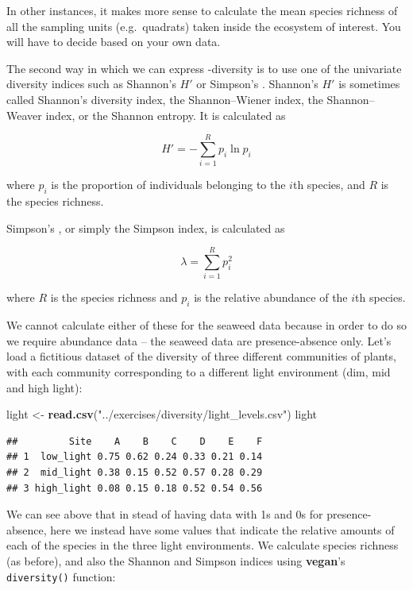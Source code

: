 \documentclass[10pt,a4,]{article}
\newenvironment{Shaded}{\begin{snugshade}}{\end{snugshade}}
\newcommand{\KeywordTok}[1]{\textcolor[rgb]{0.13,0.29,0.53}{\textbf{#1}}}
\newcommand{\NormalTok}[1]{#1}
\newcommand{\StringTok}[1]{\textcolor[rgb]{0.31,0.60,0.02}{#1}}
\begin{document}
In other instances, it makes more sense to calculate the mean species
richness of all the sampling units (e.g.~quadrats) taken inside the
ecosystem of interest. You will have to decide based on your own data.

The second way in which we can express \textalpha-diversity is to use
one of the univariate diversity indices such as Shannon's \(H'\) or
Simpson's \textlambda. Shannon's \(H'\) is sometimes called Shannon's
diversity index, the Shannon--Wiener index, the Shannon--Weaver index,
or the Shannon entropy. It is calculated as

\[\displaystyle H' = -\sum_{i=1}^{R} p_{i} \ln p_{i}\]

where \(p_{i}\) is the proportion of individuals belonging to the
\(i\)th species, and \(R\) is the species richness.

Simpson's \textlambda, or simply the Simpson index, is calculated as

\[\displaystyle \lambda = \sum_{i=1}^{R} p_{i}^{2}\]

where \(R\) is the species richness and \(p_{i}\) is the relative
abundance of the \(i\)th species.

We cannot calculate either of these for the seaweed data because in
order to do so we require abundance data -- the seaweed data are
presence-absence only. Let's load a fictitious dataset of the diversity
of three different communities of plants, with each community
corresponding to a different light environment (dim, mid and high
light):

\begin{Shaded}
\begin{Highlighting}[]
\NormalTok{light <{-}}\StringTok{ }\KeywordTok{read.csv}\NormalTok{(}\StringTok{"../exercises/diversity/light\_levels.csv"}\NormalTok{)}
\NormalTok{light}
\end{Highlighting}
\end{Shaded}

\begin{verbatim}
##         Site    A    B    C    D    E    F
## 1  low_light 0.75 0.62 0.24 0.33 0.21 0.14
## 2  mid_light 0.38 0.15 0.52 0.57 0.28 0.29
## 3 high_light 0.08 0.15 0.18 0.52 0.54 0.56
\end{verbatim}

We can see above that in stead of having data with 1s and 0s for
presence-absence, here we instead have some values that indicate the
relative amounts of each of the species in the three light environments.
We calculate species richness (as before), and also the Shannon and
Simpson indices using \textbf{vegan}'s \texttt{diversity()} function:
\end{document}

